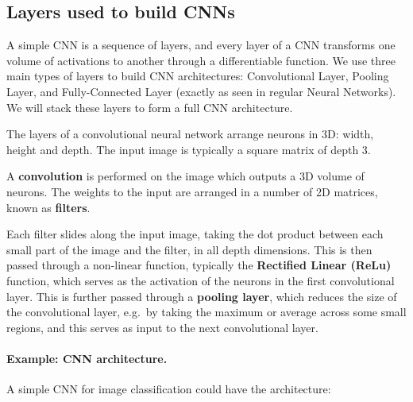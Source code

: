 \documentclass[%
oneside,                 %
final,                   %
10pt]{article}
\begin{document}
\subsection{Layers used to build CNNs}

A simple CNN is a sequence of layers, and every layer of a CNN
transforms one volume of activations to another through a
differentiable function. We use three main types of layers to build
CNN architectures: Convolutional Layer, Pooling Layer, and
Fully-Connected Layer (exactly as seen in regular Neural Networks). We
will stack these layers to form a full CNN architecture.

The layers of a convolutional neural network arrange neurons in 3D: width, height and depth.  
The input image is typically a square matrix of depth 3. 

A \textbf{convolution} is performed on the image which outputs
a 3D volume of neurons. The weights to the input are arranged in a number of 2D matrices, known as \textbf{filters}.

Each filter slides along the input image, taking the dot product
between each small part of the image and the filter, in all depth
dimensions. This is then passed through a non-linear function,
typically the \textbf{Rectified Linear (ReLu)} function, which serves as the
activation of the neurons in the first convolutional layer. This is
further passed through a \textbf{pooling layer}, which reduces the size of the
convolutional layer, e.g.~by taking the maximum or average across some
small regions, and this serves as input to the next convolutional
layer.

\paragraph{Example: CNN architecture.}
A simple CNN for image classification could have the architecture:
\end{document}
